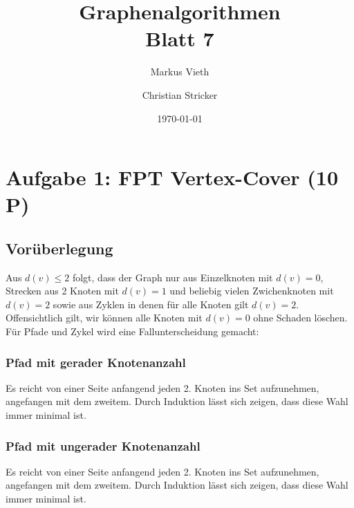 \documentclass[a4paper,11pt,twoside]{scrartcl}
\title{Graphenalgorithmen\\ Blatt 7}
\author{Markus Vieth\and Christian Stricker}
\date{\today}
\begin{document}
\maketitle
\cleardoublepage
\pagestyle{myheadings}

\newpage
\section{Aufgabe 1: FPT Vertex-Cover (10 P)}
\subsection{Vorüberlegung}
Aus $d(v) \leq 2$ folgt, dass der Graph nur aus Einzelknoten mit $d(v) = 0$, Strecken aus 2 Knoten mit $d(v) = 1$ und beliebig vielen Zwichenknoten mit $d(v) = 2$ sowie aus Zyklen in denen für alle Knoten gilt $d(v) = 2$.\\
Offensichtlich gilt, wir können alle Knoten mit $d(v) = 0$ ohne Schaden löschen. Für Pfade und Zykel wird eine Fallunterscheidung gemacht:
\subsubsection{Pfad mit gerader Knotenanzahl}
\begin{figure}[H]
\end{figure}
Es reicht von einer Seite anfangend jeden 2. Knoten ins Set aufzunehmen, angefangen mit dem zweitem. Durch Induktion lässt sich zeigen, dass diese Wahl immer minimal ist.
\subsubsection{Pfad mit ungerader Knotenanzahl}
\begin{figure}[H]
\end{figure}
Es reicht von einer Seite anfangend jeden 2. Knoten ins Set aufzunehmen, angefangen mit dem zweitem. Durch Induktion lässt sich zeigen, dass diese Wahl immer minimal ist.
\end{document}
